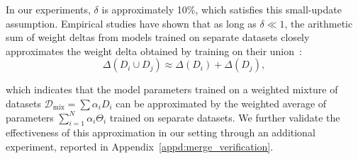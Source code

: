 In our experiments, $\delta$ is approximately 10\%, which satisfies this small-update assumption. Empirical studies have shown that as long as $\delta \ll 1$, the arithmetic sum of weight deltas from models trained on separate datasets closely approximates the weight delta obtained by training on their union~\citep{qin-etal-2022-exploring, wu2025shadow, lin2025efficient}:
\begin{equation}
\label{equ:satisfy}
    \Delta(D_i \cup D_j) \approx \Delta(D_i) + \Delta(D_j),
\end{equation}


which indicates that the model parameters trained on a weighted mixture of datasets $\mathcal{D}_{\text{mix}} = \sum \alpha_i D_i$ can be approximated by the weighted average of parameters $\sum_{i=1}^N \alpha_i \Theta_i$ trained on separate datasets. We further validate the effectiveness of this approximation in our setting through an additional experiment, reported in Appendix~\ref{appd:merge_verification}.



